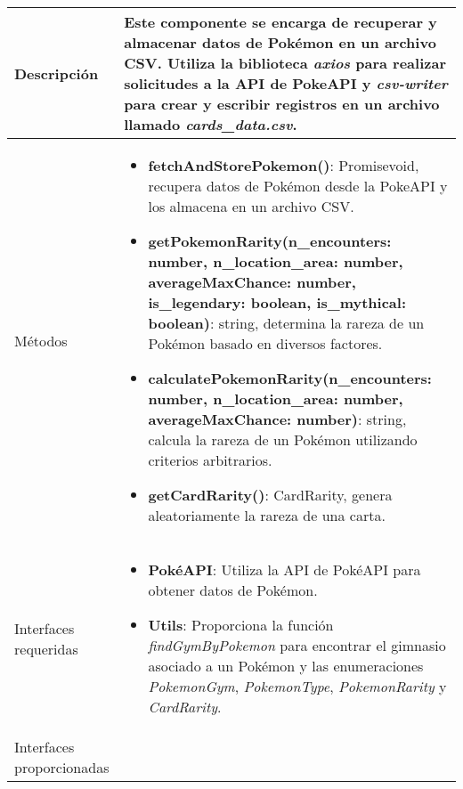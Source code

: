 \begin{longtable}{
    >{\columncolor{lightgreen!20}}p{4cm}
    p{12cm}
    }
    \midrule
    Descripción & Este componente se encarga de recuperar y almacenar datos de Pokémon en un archivo CSV. Utiliza la biblioteca \textit{axios} para realizar solicitudes a la API de PokeAPI y \textit{csv-writer} para crear y escribir registros en un archivo llamado \textit{cards_data.csv}. \\
    \midrule
    Métodos &
    \begin{itemize}[nosep,leftmargin=*]
      \item \textbf{fetchAndStorePokemon()}: Promise\<void\>, recupera datos de Pokémon desde la PokeAPI y los almacena en un archivo CSV.
      \item \textbf{getPokemonRarity(n_encounters: number, n_location_area: number, averageMaxChance: number, is_legendary: boolean, is_mythical: boolean)}: string, determina la rareza de un Pokémon basado en diversos factores.
      \item \textbf{calculatePokemonRarity(n_encounters: number, n_location_area: number, averageMaxChance: number)}: string, calcula la rareza de un Pokémon utilizando criterios arbitrarios.
      \item \textbf{getCardRarity()}: CardRarity, genera aleatoriamente la rareza de una carta.
    \end{itemize} \\
    \midrule
    Interfaces requeridas & \begin{itemize}[nosep,leftmargin=*]
      \item \textbf{PokéAPI}: Utiliza la API de PokéAPI para obtener datos de Pokémon.
      \item \textbf{Utils}: Proporciona la función \textit{findGymByPokemon} para encontrar el gimnasio asociado a un Pokémon y las enumeraciones \textit{PokemonGym}, \textit{PokemonType}, \textit{PokemonRarity} y \textit{CardRarity}.
    \end{itemize} \\
    \midrule
    Interfaces proporcionadas & \\
    \end{longtable}

